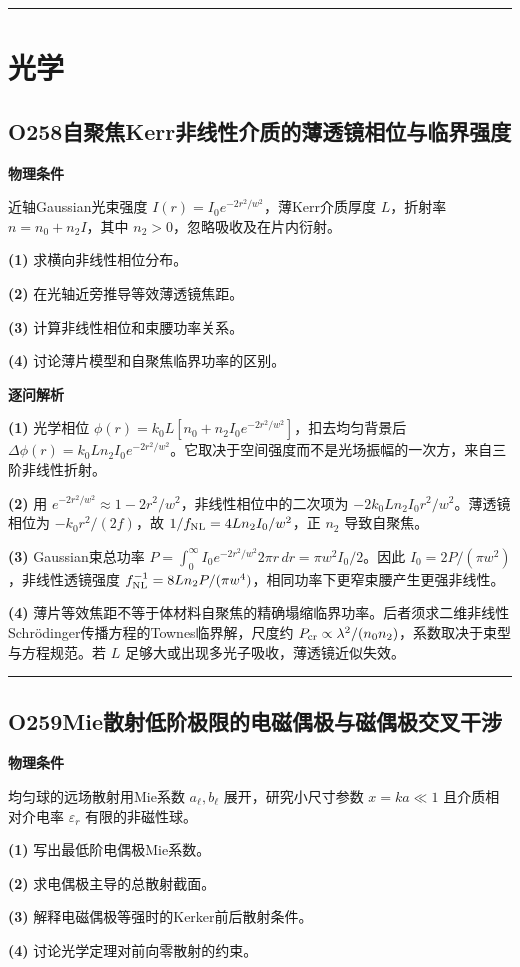 \documentclass[UTF8,a4paper,11pt,oneside,openany]{ctexbook}
\begin{document}
\par\bigskip\hrule\bigskip
\chapter{光学}
\section*{O258\quad 自聚焦Kerr非线性介质的薄透镜相位与临界强度}
\textbf{物理条件}\par 近轴Gaussian光束强度 \(I(r)=I_0e^{-2r^2/w^2}\)，薄Kerr介质厚度 \(L\)，折射率 \(n=n_0+n_2I\)，其中 \(n_2>0\)，忽略吸收及在片内衍射。
\par\noindent\textbf{(1)} 求横向非线性相位分布。
\par\noindent\textbf{(2)} 在光轴近旁推导等效薄透镜焦距。
\par\noindent\textbf{(3)} 计算非线性相位和束腰功率关系。
\par\noindent\textbf{(4)} 讨论薄片模型和自聚焦临界功率的区别。

\par\medskip\noindent\textbf{逐问解析}
\par\noindent\textbf{(1)} 光学相位 \(\phi(r)=k_0L[n_0+n_2I_0e^{-2r^2/w^2}]\)，扣去均匀背景后 \(\Delta\phi(r)=k_0Ln_2I_0e^{-2r^2/w^2}\)。它取决于空间强度而不是光场振幅的一次方，来自三阶非线性折射。
\par\noindent\textbf{(2)} 用 \(e^{-2r^2/w^2}\approx1-2r^2/w^2\)，非线性相位中的二次项为 \(-2k_0Ln_2I_0r^2/w^2\)。薄透镜相位为 \(-k_0r^2/(2f)\)，故 \(1/f_{\rm NL}=4Ln_2I_0/w^2\)，正 \(n_2\) 导致自聚焦。
\par\noindent\textbf{(3)} Gaussian束总功率 \(P=\int_0^\infty I_0e^{-2r^2/w^2}2\pi r\,dr=\pi w^2I_0/2\)。因此 \(I_0=2P/(\pi w^2)\)，非线性透镜强度 \(f_{\rm NL}^{-1}=8Ln_2P/(\pi w^4)\)，相同功率下更窄束腰产生更强非线性。
\par\noindent\textbf{(4)} 薄片等效焦距不等于体材料自聚焦的精确塌缩临界功率。后者须求二维非线性Schrödinger传播方程的Townes临界解，尺度约 \(P_{\rm cr}\propto\lambda^2/(n_0n_2)\)，系数取决于束型与方程规范。若 \(L\) 足够大或出现多光子吸收，薄透镜近似失效。

\par\bigskip\hrule\bigskip
\section*{O259\quad Mie散射低阶极限的电磁偶极与磁偶极交叉干涉}
\textbf{物理条件}\par 均匀球的远场散射用Mie系数 \(a_\ell,b_\ell\) 展开，研究小尺寸参数 \(x=ka\ll1\) 且介质相对介电率 \(\varepsilon_r\) 有限的非磁性球。
\par\noindent\textbf{(1)} 写出最低阶电偶极Mie系数。
\par\noindent\textbf{(2)} 求电偶极主导的总散射截面。
\par\noindent\textbf{(3)} 解释电磁偶极等强时的Kerker前后散射条件。
\par\noindent\textbf{(4)} 讨论光学定理对前向零散射的约束。
\end{document}
